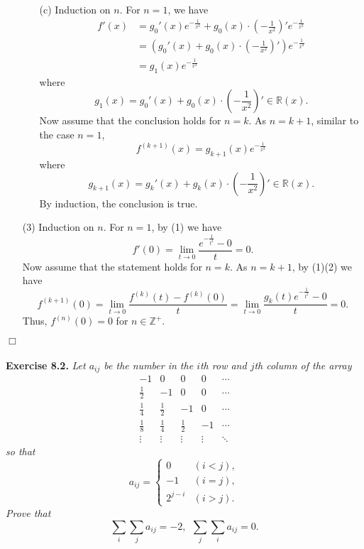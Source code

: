 \documentclass{article}
\begin{document}
\begin{enumerate}
\begin{enumerate}
  \item[(c)]
  Induction on $n$.
  For $n = 1$, we have
  \begin{align*}
    f'(x)
    &= g_0'(x) e^{-\frac{1}{x^2}}
      + g_0(x) \cdot \left( -\frac{1}{x^2} \right)' e^{-\frac{1}{x^2}} \\
    &= \left( g_0'(x) + g_0(x) \cdot \left( -\frac{1}{x^2} \right)' \right) e^{-\frac{1}{x^2}} \\
    &= g_1(x) e^{-\frac{1}{x^2}}
  \end{align*}
  where
  \[
    g_1(x) = g_0'(x) + g_0(x) \cdot \left(-\frac{1}{x^2}\right)' \in \mathbb{R}(x).
  \]
  Now assume that the conclusion holds for $n = k$.
  As $n = k + 1$, similar to the case $n = 1$,
  \[
    f^{(k + 1)}(x) = g_{k + 1}(x) e^{-\frac{1}{x^2}}
  \]
  where
  \[
    g_{k + 1}(x)
    = g_k'(x) + g_k(x) \cdot \left( -\frac{1}{x^2} \right)' \in \mathbb{R}(x).
  \]
  By induction, the conclusion is true.
  \end{enumerate}

\item[(3)]
Induction on $n$.
For $n = 1$, by (1) we have
\[
  f'(0) = \lim_{t \rightarrow 0} \frac{e^{- \frac{1}{t^2}} - 0}{t} = 0.
\]
Now assume that the statement holds for $n = k$.
As $n = k + 1$, by (1)(2) we have
\[
  f^{(k + 1)}(0)
  = \lim_{t \rightarrow 0} \frac{f^{(k)}(t) - f^{(k)}(0)}{t}
  = \lim_{t \rightarrow 0} \frac{g_k(t) e^{- \frac{1}{t^2}} - 0}{t} = 0.
\]
Thus, $f^{(n)}(0) = 0$ for $n \in \mathbb{Z}^+$.
\end{enumerate}
$\Box$ \\\\






\textbf{Exercise 8.2.}
\emph{Let $a_{ij}$ be the number in the $i$th row and $j$th column of the array
\[
\begin{array}{rrrrr}
           -1 &           0 &           0 &      0 & \cdots \\
  \frac{1}{2} &          -1 &           0 &      0 & \cdots \\
  \frac{1}{4} & \frac{1}{2} &          -1 &      0 & \cdots \\
  \frac{1}{8} & \frac{1}{4} & \frac{1}{2} &     -1 & \cdots \\
       \vdots &      \vdots &      \vdots & \vdots & \ddots
\end{array}
\]
so that
\begin{equation*}
  a_{ij} =
    \begin{cases}
      0       & (i < j), \\
      -1      & (i = j), \\
      2^{j-i} & (i > j).
    \end{cases}
\end{equation*}
Prove that
\[
  \sum_{i} \sum_{j} a_{ij} = -2, \:\: \sum_{j} \sum_{i} a_{ij} = 0.
\]
} \\
\end{document}
